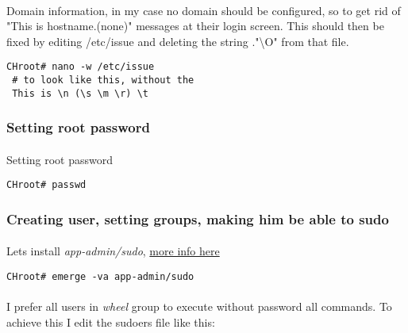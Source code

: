 \documentclass[10pt,a4paper]{article}
\begin{document}
                    \paragraph{} Domain information, in my case no domain should be configured, so to get rid of "This is hostname.(none)" messages at their login screen. This should then be fixed by editing /etc/issue and deleting the string ."\textbackslash O" from that file.

                    \begin{lstlisting}[style=BashInputCHRoot]
 CHroot# nano -w /etc/issue
 # to look like this, without the
 This is \n (\s \m \r) \t
                    \end{lstlisting}

                \newpage
                \subsubsection{Setting root password}

                    \paragraph{} Setting root password

                    \begin{lstlisting}[style=BashInputCHRoot]
 CHroot# passwd
                    \end{lstlisting}

                \newpage
                \subsubsection{Creating user, setting groups, making him be able to sudo}

                    \paragraph{} Lets install \textit{app-admin/sudo},  \href{https://wiki.gentoo.org/wiki/Sudo}{more info here}

                    \begin{lstlisting}[style=BashInputCHRoot]
 CHroot# emerge -va app-admin/sudo
                    \end{lstlisting}

                    \paragraph{} I prefer all users in \textit{wheel} group to execute without password all commands. To achieve this I edit the sudoers file like this:
\end{document}
